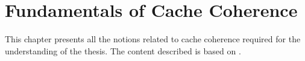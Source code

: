 \chapter{Fundamentals of Cache Coherence}
\label{cha:cache_coherence}
This chapter presents all the notions related to cache coherence required for
the understanding of the thesis. The content described is based on
\cite{Sorin:2011:PMC:2028905}.

\stopallthesefloats{}

\stopallthesefloats{}

\stopallthesefloats{}

\stopallthesefloats{}

\stopallthesefloats{}

\stopallthesefloats{}

\stopallthesefloats{}

